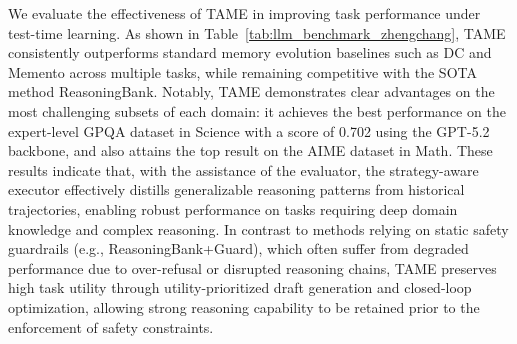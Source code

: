 \documentclass{article}
\theoremstyle{plain}
\theoremstyle{definition}
\theoremstyle{remark}
\begin{document}
We evaluate the effectiveness of TAME in improving task performance under test-time learning. As shown in Table~\ref{tab:llm_benchmark_zhengchang}, TAME consistently outperforms standard memory evolution baselines such as DC and Memento across multiple tasks, while remaining competitive with the SOTA method ReasoningBank. Notably, TAME demonstrates clear advantages on the most challenging subsets of each domain: it achieves the best performance on the expert-level GPQA dataset in Science with a score of 0.702 using the GPT-5.2 backbone, and also attains the top result on the AIME dataset in Math. These results indicate that, with the assistance of the evaluator, the strategy-aware executor effectively distills generalizable reasoning patterns from historical trajectories, enabling robust performance on tasks requiring deep domain knowledge and complex reasoning. In contrast to methods relying on static safety guardrails (e.g., ReasoningBank+Guard), which often suffer from degraded performance due to over-refusal or disrupted reasoning chains, TAME preserves high task utility through utility-prioritized draft generation and closed-loop optimization, allowing strong reasoning capability to be retained prior to the enforcement of safety constraints.
\end{document}
